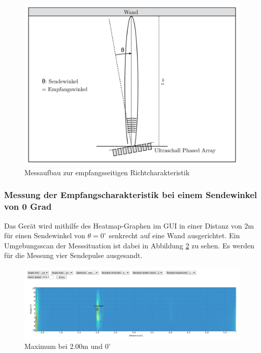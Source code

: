 \begin{figure}[htb]
\includegraphics[width=\textwidth]{graphics/image_test_messaufbau_1.png}
\caption{Messaufbau zur empfangsseitigen Richtcharakteristik} %
\label{fig:image_test_messaufbau_1}
\end{figure}
%

\clearpage

\subsubsection{Messung der Empfangscharakteristik bei einem Sendewinkel von 0 Grad}
Das Gerät wird mithilfe des Heatmap-Graphen im GUI in einer Distanz von $2 \mathrm{m}$ für einen Sendewinkel von $\theta = 0^{\circ}$ senkrecht auf eine Wand ausgerichtet. Ein Umgebungsscan der Messsituation ist dabei in Abbildung \ref{fig:image_test_characteristic_receiver_0_deg_send} zu sehen. Es werden für die Messung vier Sendepulse ausgesandt.

\begin{figure}[htb]
\includegraphics[width=\textwidth]{graphics/image_test_characteristic_receiver_0_deg_send.png}
\caption{Maximum bei $2.00 \mathrm{m}$ und $0^{\circ}$} %
\label{fig:image_test_characteristic_receiver_0_deg_send}
\end{figure}
%

